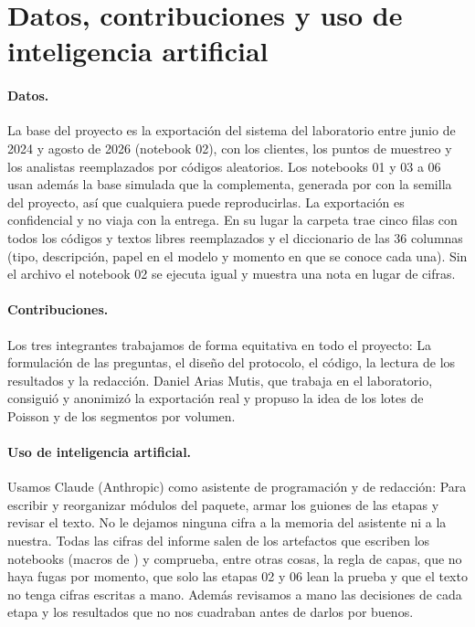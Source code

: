\section{Datos, contribuciones y uso de inteligencia artificial}
\label{sec:contribuciones}

\paragraph{Datos.} La base del proyecto es la exportación del sistema del
laboratorio entre junio de 2024 y agosto de 2026 (notebook 02), con los
clientes, los puntos de muestreo y los analistas reemplazados por códigos
aleatorios. Los notebooks 01 y 03 a 06 usan además la base simulada que la
complementa, generada por  con la
semilla del proyecto, así que cualquiera puede reproducirlas. La exportación
es confidencial y no viaja con la entrega. En su lugar la
carpeta  trae cinco filas con todos los códigos y textos
libres reemplazados y el diccionario de las 36 columnas (tipo, descripción,
papel en el modelo y momento en que se conoce cada una). Sin el archivo el
notebook 02 se ejecuta igual y muestra una nota en lugar de cifras.

\paragraph{Contribuciones.} Los tres integrantes trabajamos de forma
equitativa en todo el proyecto: La formulación de las preguntas, el diseño
del protocolo, el código, la lectura de los resultados y la redacción. Daniel
Arias Mutis, que trabaja en el laboratorio, consiguió y anonimizó la
exportación real y propuso la idea de los lotes de Poisson y de los segmentos
por volumen.

\paragraph{Uso de inteligencia artificial.} Usamos Claude (Anthropic) como
asistente de programación y de redacción: Para escribir y reorganizar
módulos del paquete, armar los guiones de las etapas y revisar el texto. No
le dejamos ninguna cifra a la memoria del asistente ni a la nuestra. Todas
las cifras del informe salen de los artefactos que escriben los notebooks
(macros de ) y  comprueba,
entre otras cosas, la regla de capas, que no haya fugas por momento, que solo
las etapas 02 y 06 lean la prueba y que el texto no tenga cifras escritas a
mano. Además revisamos a mano las decisiones de cada etapa y los resultados
que no nos cuadraban antes de darlos por buenos.
